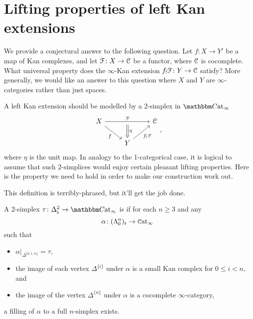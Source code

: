 \documentclass[main.tex]{subfiles}
\begin{document}
\section{Lifting properties of left Kan extensions}
\label{sec:con_extensions}

We provide a conjectural answer to the following question. Let $f\colon X \to Y'$ be a map of Kan complexes, and let $\mathcal{F}\colon X \to \mathcal{C}$ be a functor, where $\mathcal{C}$ is cocomplete. What universal property does the $\infty$-Kan extension $f_{!}\mathcal{F}\colon Y \to \mathcal{C}$ satisfy? More generally, we would like an answer to this question where $X$ and $Y$ are $\infty$-categories rather than just spaces.

A left Kan extension should be modelled by a 2-simplex in $\ICCat$
\begin{equation*}
  \label{eq:left_kan_ext}
  \begin{tikzcd}
    X
    \arrow[rr, "\mathcal{F}", ""{below, name=M}]
    \arrow[dr, swap, "f"]
    && \category{C}
    \\
    & Y
    \arrow[ur, swap, "f_{!}\mathcal{F}"]
    \arrow[from=M, Rightarrow, "\eta"]
  \end{tikzcd},
\end{equation*}
where $\eta$ is the unit map. In analogy to the 1-categorical case, it is logical to assume that such $2$-simplices would enjoy certain pleasant lifting properties. Here is the property we need to hold in order to make our construction work out.

This definition is terribly-phrased, but it'll get the job done.
\begin{definition}
  \label{def:left_kan}
  A 2-simplex $\tau\colon \Delta^{2}_{\flat} \to \ICCat$ is  if for each $n \geq 3$ and any
  \begin{equation*}
    \alpha\colon (\Lambda^{n}_{0})_{\flat} \to \mathcal{C}\mathrm{at}_{\infty}
  \end{equation*}
  such that 
  \begin{itemize}
    \item $\alpha|_{\Delta^{\{0,1,n\}}} = \tau$,

    \item the image of each vertex $\Delta^{\{i\}}$ under $\alpha$ is a small Kan complex for $0 \leq i < n$, and

    \item the image of the vertex $\Delta^{\{n\}}$ under $\alpha$ is a cocomplete $\infty$-category,
  \end{itemize}
  a filling of $\alpha$ to a full $n$-simplex exists.
\end{definition}
\end{document}
